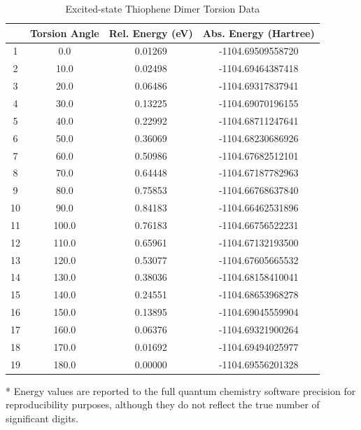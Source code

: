 \begin{table}[hbt!]\centering
\caption{Excited-state Thiophene Dimer Torsion Data}
\renewcommand{\arraystretch}{1.5}
\begin{threeparttable}
\begin{tabular}{cccc}\toprule
  {} & {Torsion Angle} & {Rel. Energy (eV)} & {Abs. Energy (Hartree)} \\ \midrule
    1 & 0.0 & 0.01269 & -1104.69509558720\\
    2 & 10.0 & 0.02498 & -1104.69464387418\\
    3 & 20.0 & 0.06486 & -1104.69317837941\\
    4 & 30.0 & 0.13225 & -1104.69070196155\\
    5 & 40.0 & 0.22992 & -1104.68711247641\\
    6 & 50.0 & 0.36069 & -1104.68230686926\\
    7 & 60.0 & 0.50986 & -1104.67682512101\\
    8 & 70.0 & 0.64448 & -1104.67187782963\\
    9 & 80.0 & 0.75853 & -1104.66768637840\\
    10 & 90.0 & 0.84183 &  -1104.66462531896\\
    11 & 100.0 & 0.76183 & -1104.66756522231\\
    12 & 110.0 & 0.65961 & -1104.67132193500\\
    13 & 120.0 & 0.53077 & -1104.67605665532\\
    14 & 130.0 & 0.38036 & -1104.68158410041\\
    15 & 140.0 & 0.24551 & -1104.68653968278\\
    16 & 150.0 & 0.13895 & -1104.69045559904\\
    17 & 160.0 & 0.06376 & -1104.69321900264\\
    18 & 170.0 & 0.01692 & -1104.69494025977\\
    19 & 180.0 & 0.00000 & -1104.69556201328\\ \bottomrule
\end{tabular}
\begin{tablenotes}
\item[*] \footnotesize Energy values are reported to the full quantum chemistry software precision for reproducibility purposes, although they do not reflect the true number of significant digits.
\end{tablenotes}
\end{threeparttable}
\end{table}

